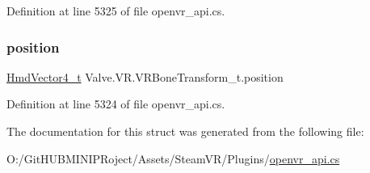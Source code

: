 Definition at line 5325 of file openvr\+\_\+api.\+cs.

\mbox{\label{struct_valve_1_1_v_r_1_1_v_r_bone_transform__t_afeca40634db5d8576d54ff5795f829ca}} 
\subsubsection{\texorpdfstring{position}{position}}
{\footnotesize\ttfamily \mbox{\hyperlink{struct_valve_1_1_v_r_1_1_hmd_vector4__t}{Hmd\+Vector4\+\_\+t}} Valve.\+V\+R.\+V\+R\+Bone\+Transform\+\_\+t.\+position}



Definition at line 5324 of file openvr\+\_\+api.\+cs.



The documentation for this struct was generated from the following file\+:\begin{DoxyCompactItemize}
\item 
O\+:/\+Git\+H\+U\+B\+M\+I\+N\+I\+P\+Roject/\+Assets/\+Steam\+V\+R/\+Plugins/\mbox{\hyperlink{openvr__api_8cs}{openvr\+\_\+api.\+cs}}\end{DoxyCompactItemize}
